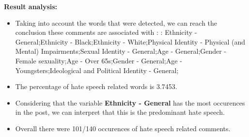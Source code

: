 \documentclass[11pt]{article}
\begin{document}
\textbf{\Large Result analysis:}

\begin{itemize}\item Taking into account the words that were detected, we can reach the conclusion these comments are associated with : : Ethnicity - General;Ethnicity - Black;Ethnicity - White;Physical Identity - Physical (and Mental) Impairments;Sexual Identity - General;Age - General;Gender - Female sexuality;Age - Over 65s;Gender - General;Age - Youngsters;Ideological and Political Identity - General;%

\item The percentage of hate speech related words is 3.7453.

\item Considering that the variable \textbf{Ethnicity - General} has the most occurences in the post, we can interpret that this is the predominant hate speech.

\item Overall there were 101/140 occurences of hate speech related comments.\end{itemize}
\end{document}
